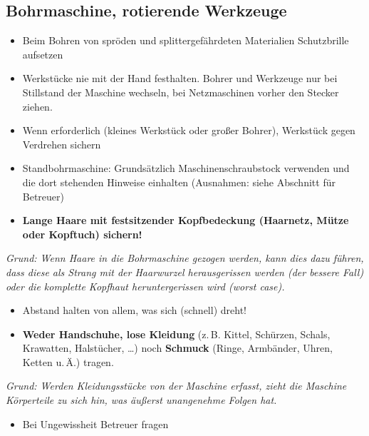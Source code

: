 \documentclass[13pt]{\basedir/fablab-document}
\begin{document}
\subsection{Bohrmaschine, rotierende Werkzeuge}

\begin{itemize}
	\item Beim Bohren von spröden und splittergefährdeten Materialien Schutzbrille aufsetzen
	\item Werkstücke nie mit der Hand festhalten. Bohrer und Werkzeuge nur bei Stillstand der Maschine wechseln, bei Netzmaschinen vorher den Stecker ziehen.
	\item Wenn erforderlich (kleines Werkstück oder großer Bohrer), Werkstück gegen Verdrehen sichern
	\item Standbohrmaschine: Grundsätzlich Maschinenschraubstock verwenden und die dort stehenden Hinweise einhalten (Ausnahmen: siehe Abschnitt für Betreuer)
	\item \textbf{Lange Haare mit festsitzender Kopfbedeckung (Haarnetz, Mütze oder Kopftuch) sichern!}
\end{itemize}
\textit{Grund: Wenn Haare in die Bohrmaschine gezogen werden, kann dies dazu führen, dass diese als Strang mit der Haarwurzel herausgerissen werden (der bessere Fall) oder die komplette Kopfhaut heruntergerissen wird (worst case).}

\begin{itemize}
	\item Abstand halten von allem, was sich (schnell) dreht!
	\item \textbf{Weder Handschuhe, lose Kleidung} (z.\,B. Kittel, Schürzen, Schals, Krawatten, Halstücher, \dots) noch \textbf{Schmuck} (Ringe, Arm\-bänder, Uhren, Ketten u.\,Ä.) tragen.
\end{itemize}
\textit{Grund: Werden Kleidungsstücke von der Maschine erfasst, zieht die Maschine Körperteile zu sich hin, was äußerst unangenehme Folgen hat.}

\begin{itemize}
	\item Bei Ungewissheit Betreuer fragen
\end{itemize}
\end{document}
